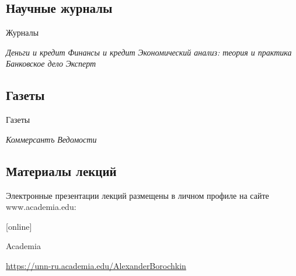 \documentclass[_Banking_p1.tex]{subfiles}
\begin{document}
\subsection*{Научные журналы}

\begin{frame}{Журналы}
    
  \begin{thebibliography}{10}
  
  \beamertemplatearticlebibitems
  \bibitem{}
  {\em Деньги и кредит}
  \bibitem{}
  	{\em Финансы и кредит}
  \bibitem{}
  	{\em Экономический анализ: теория и практика}
  \bibitem{}
  	{\em Банковское дело}
  \bibitem{}
  	{\em Эксперт}
  \end{thebibliography}
\end{frame}

\subsection*{Газеты}

\begin{frame}{Газеты}
    
  \begin{thebibliography}{10}
  
  \beamertemplatearticlebibitems
  \bibitem{}
  	{\em Коммерсантъ}
  \bibitem{}
  	{\em Ведомости}
  \end{thebibliography}
\end{frame}

\subsection*{Материалы лекций}
\begin{frame}
Электронные презентации лекций размещены в личном профиле на сайте www.academia.edu:
  \begin{thebibliography}{10}
  
  [online]

  Academia
    
    \footnotesize{\url{https://unn-ru.academia.edu/AlexanderBorochkin}}
  \end{thebibliography}
\end{frame}
\end{document}

